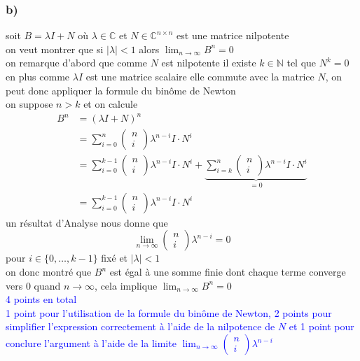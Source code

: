 \documentclass[11pt, a4paper, oneside]{article}
\begin{document}
\subsubsection*{b)}
soit $B=\lambda I+N$ où $\lambda \in \mathbb{C}$ et $N \in \mathbb{C}^{n \times n}$ est une matrice nilpotente \\
on veut montrer que si $|\lambda|<1$ alors $\lim_{n\rightarrow \infty}B^n = 0$ \\
{\tiny on remarque d'abord que comme $N$ est nilpotente il existe $k \in \mathbb{N}$ tel que $N^k = 0$} \\
{\tiny en plus comme $\lambda I$ est une matrice scalaire elle commute avec la matrice $N$,} on peut donc appliquer la formule du binôme de Newton \\
on suppose $n>k$ et on calcule
\begin{align*}
    B^n &= (\lambda I + N)^n \\
    &= \sum_{i=0}^n \begin{pmatrix} n \\ i \end{pmatrix} \lambda^{n-i}I \cdot N^i \\
    &= \sum_{i=0}^{k-1} \begin{pmatrix} n \\ i \end{pmatrix} \lambda^{n-i}I \cdot N^i + \underbrace{\sum_{i=k}^n \begin{pmatrix} n \\ i \end{pmatrix} \lambda^{n-i}I \cdot N^i}_{=0} \\
    &= \sum_{i=0}^{k-1} \begin{pmatrix} n \\ i \end{pmatrix} \lambda^{n-i}I \cdot N^i
\end{align*}
{\tiny un résultat d'Analyse nous donne que} $$\lim_{n \rightarrow \infty} \begin{pmatrix} n \\ i \end{pmatrix} \lambda^{n-i} = 0$$ pour $i \in \{0,\ldots,k-1\}$ fixé et $|\lambda|<1$ \\
{\tiny on donc montré que $B^n$ est égal à une somme finie dont} chaque terme converge vers 0 quand $n \rightarrow \infty$, cela implique $\lim_{n\rightarrow \infty}B^n = 0$ \\
\textcolor{blue}{4 points en total \\ 1 point pour l'utilisation de la formule du binôme de Newton, 2 points pour simplifier l'expression correctement à l'aide de la nilpotence de $N$ et 1 point pour conclure l'argument à l'aide de la limite $\lim_{n \rightarrow \infty} \begin{pmatrix} n \\ i \end{pmatrix} \lambda^{n-i}$} 
\end{document}
